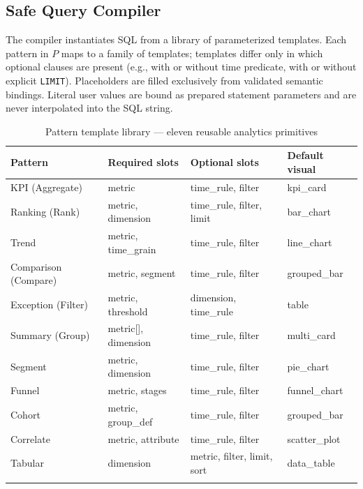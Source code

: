 \documentclass[11pt]{article}
\begin{document}
\subsection{Safe Query Compiler\label{sec:compiler}}
The compiler instantiates SQL from a library of parameterized templates. Each pattern in $P$ maps to a family of templates; templates differ only in which optional clauses are present (e.g., with or without time predicate, with or without explicit \texttt{LIMIT}). Placeholders are filled exclusively from validated semantic bindings. Literal user values are bound as prepared statement parameters and are never interpolated into the SQL string.

\begin{longtable}{llll}
\toprule
\textbf{Pattern} & \textbf{Required slots} & \textbf{Optional slots} & \textbf{Default visual}\\
\midrule
KPI (Aggregate) & metric & time\_rule, filter & kpi\_card\\
Ranking (Rank) & metric, dimension & time\_rule, filter, limit & bar\_chart\\
Trend & metric, time\_grain & time\_rule, filter & line\_chart\\
Comparison (Compare) & metric, segment & time\_rule, filter & grouped\_bar\\
Exception (Filter) & metric, threshold & dimension, time\_rule & table\\
Summary (Group) & metric[], dimension & time\_rule, filter & multi\_card\\
Segment & metric, dimension & time\_rule, filter & pie\_chart\\
Funnel & metric, stages & time\_rule, filter & funnel\_chart\\
Cohort & metric, group\_def & time\_rule, filter & grouped\_bar\\
Correlate & metric, attribute & time\_rule, filter & scatter\_plot\\
Tabular & dimension & metric, filter, limit, sort & data\_table\\
\bottomrule
\caption{Pattern template library --- eleven reusable analytics primitives}\label{tab:patterns}
\end{longtable}
\end{document}
